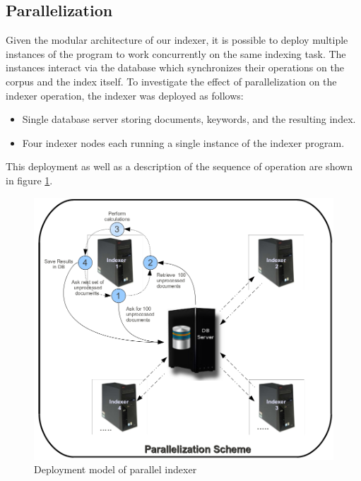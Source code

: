 \documentclass[10pt]{article}
\begin{document}
\subsection{Parallelization}
\label{parallelization}
Given the modular architecture of our indexer, it is possible to
deploy multiple instances of the program to work concurrently on the same
indexing task. The instances interact via the database which
synchronizes their operations on the corpus and the index itself. To
investigate the effect of parallelization on the indexer operation, the
indexer was deployed as follows:

\begin{itemize}
\item Single database server storing documents, keywords, and the
  resulting index.
\item Four indexer nodes each running a single instance of the indexer
  program. 
\end{itemize}

This deployment as well as a description of the sequence of operation
are shown in figure \ref{fig:paralleldeploymentmodel}.

\begin{figure}[h]
  \begin{center}
    \includegraphics[width=\textwidth,height=!]{paralleldeploymentmodel}
  \end{center}
  \caption{Deployment model of parallel indexer} 
  \label{fig:paralleldeploymentmodel}
\end{figure}
\end{document}
